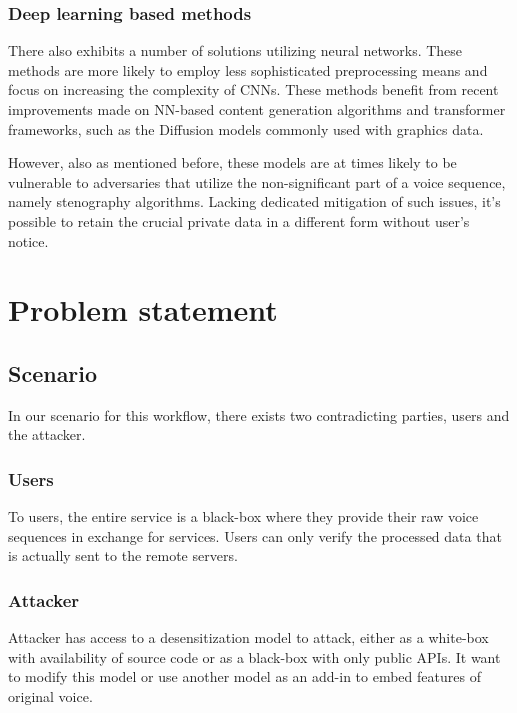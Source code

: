 \documentclass[journal]{IEEEtran} %
\begin{document}
\begin{CJK*}{UTF8}{gbsn}
\subsubsection{Deep learning based methods}

There also exhibits a number of solutions utilizing neural networks. These methods are more likely to employ less sophisticated preprocessing means and focus on increasing the complexity of CNNs. These methods benefit from recent improvements made on NN-based content generation algorithms and transformer frameworks, such as the Diffusion models commonly used with graphics data.\cite{a8}

However, also as mentioned before, these models are at times likely to be vulnerable to adversaries that utilize the non-significant part of a voice sequence, namely stenography algorithms. Lacking dedicated mitigation of such issues, it's possible to retain the crucial private data in a different form without user's notice.

\section{Problem statement}

\subsection{Scenario}

In our scenario for this workflow, there exists two contradicting parties, users and the attacker.

\subsubsection{Users}

To users, the entire service is a black-box where they provide their raw voice sequences in exchange for services. Users can only verify the processed data that is actually sent to the remote servers.

\subsubsection{Attacker}

Attacker has access to a desensitization model to attack, either as a white-box with availability of source code or as a black-box with only public APIs. It want to modify this model or use another model as an add-in to embed features of original voice.


\end{CJK*}
\end{document}
